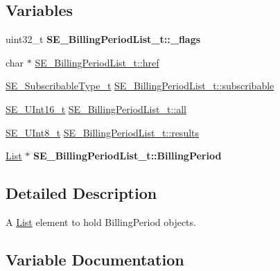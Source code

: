 \subsection*{Variables}
\begin{DoxyCompactItemize}
\item 
\mbox{\label{group__BillingPeriodList_gabd43dc579b594576e5f3239fafc397f8}} 
uint32\+\_\+t {\bfseries S\+E\+\_\+\+Billing\+Period\+List\+\_\+t\+::\+\_\+flags}
\item 
char $\ast$ \hyperlink{group__BillingPeriodList_ga25178fff55f503152774d69d8a90203d}{S\+E\+\_\+\+Billing\+Period\+List\+\_\+t\+::href}
\item 
\hyperlink{group__SubscribableType_ga5c41f553d369710ed34619266bf2551e}{S\+E\+\_\+\+Subscribable\+Type\+\_\+t} \hyperlink{group__BillingPeriodList_ga8640613b3a337e43533d8476ab44133d}{S\+E\+\_\+\+Billing\+Period\+List\+\_\+t\+::subscribable}
\item 
\hyperlink{group__UInt16_gac68d541f189538bfd30cfaa712d20d29}{S\+E\+\_\+\+U\+Int16\+\_\+t} \hyperlink{group__BillingPeriodList_ga989aa3386d8c97fd6463ef916625f7e0}{S\+E\+\_\+\+Billing\+Period\+List\+\_\+t\+::all}
\item 
\hyperlink{group__UInt8_gaf7c365a1acfe204e3a67c16ed44572f5}{S\+E\+\_\+\+U\+Int8\+\_\+t} \hyperlink{group__BillingPeriodList_gadc844269764abba471b730d50aad225e}{S\+E\+\_\+\+Billing\+Period\+List\+\_\+t\+::results}
\item 
\mbox{\label{group__BillingPeriodList_ga0a472079a60c9401a0e0f2e13bd86b99}} 
\hyperlink{structList}{List} $\ast$ {\bfseries S\+E\+\_\+\+Billing\+Period\+List\+\_\+t\+::\+Billing\+Period}
\end{DoxyCompactItemize}


\subsection{Detailed Description}
A \hyperlink{structList}{List} element to hold Billing\+Period objects. 

\subsection{Variable Documentation}
\mbox{\label{group__BillingPeriodList_ga989aa3386d8c97fd6463ef916625f7e0}} 
